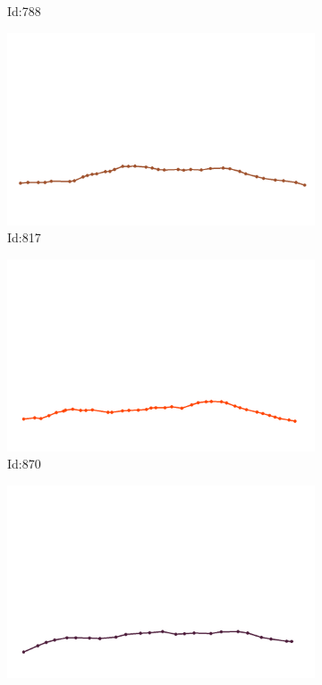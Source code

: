 \documentclass[12pt,twoside]{report}
\begin{document}
\begin{figure}
\begin{subfigure}[b]{0.20\textwidth}
\caption{Id:788}
\end{subfigure}
\begin{subfigure}[b]{0.20\textwidth}
\centering
\includegraphics[width=\textwidth]{../../trajectories/817.png}
\caption{Id:817}
\end{subfigure}
\begin{subfigure}[b]{0.20\textwidth}
\centering
\includegraphics[width=\textwidth]{../../trajectories/870.png}
\caption{Id:870}
\end{subfigure}
\begin{subfigure}[b]{0.20\textwidth}
\centering
\includegraphics[width=\textwidth]{../../trajectories/879.png}

\end{subfigure}
\end{figure}
\end{document}
